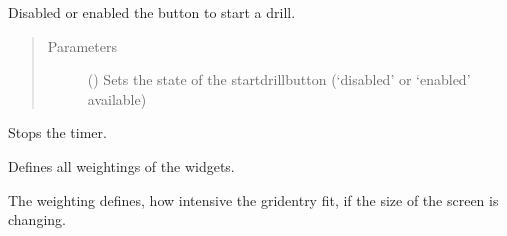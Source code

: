 \documentclass[letterpaper,10pt,english]{sphinxmanual}
\begin{document}
\begin{fulllineitems}
\begin{fulllineitems}
\label{\detokenize{anoog.automation:anoog.automation.graphical_user_interface.Train_Window.start_button_change}}
\sphinxAtStartPar
Disabled or enabled the button to start a drill.
\begin{quote}\begin{description}
\item[{Parameters}] \leavevmode
\sphinxAtStartPar
{} () \textendash{} Sets the state of the start\sphinxhyphen{}drill\sphinxhyphen{}button (‘disabled’ or ‘enabled’ available)

\end{description}\end{quote}

\end{fulllineitems}


\begin{fulllineitems}
\label{\detokenize{anoog.automation:anoog.automation.graphical_user_interface.Train_Window.stop_time}}
\sphinxAtStartPar
Stops the timer.

\end{fulllineitems}


\begin{fulllineitems}
\label{\detokenize{anoog.automation:anoog.automation.graphical_user_interface.Train_Window.weighting}}
\sphinxAtStartPar
Defines all weightings of the widgets.

\sphinxAtStartPar
The weighting defines, how intensive the grid\sphinxhyphen{}entry fit, if the size of the screen is changing.

\end{fulllineitems}


\end{fulllineitems}
\end{document}
